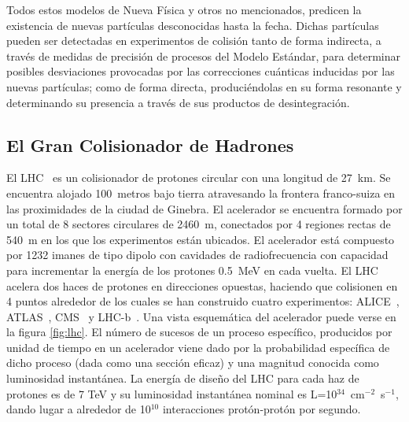 Todos estos modelos de Nueva Física y otros no mencionados, predicen la existencia de nuevas partículas desconocidas hasta la fecha. Dichas partículas pueden ser detectadas en experimentos de colisión tanto de forma indirecta, a través de medidas de precisión de procesos del Modelo Estándar, para determinar posibles desviaciones provocadas por las correcciones cuánticas inducidas por las nuevas partículas; como de forma directa, produciéndolas en su forma resonante y determinando su presencia a través de sus productos de desintegración.   


\subsection{El Gran Colisionador de Hadrones}

El LHC~\cite{LHC} es un colisionador de protones circular con una longitud de 27~km. Se encuentra alojado 100~metros bajo tierra atravesando la frontera franco-suiza en las proximidades de la ciudad de Ginebra. El acelerador se encuentra formado por un total de 8 sectores circulares de 2460~m, conectados por 4 regiones rectas de 540~m en los que los experimentos están ubicados. El acelerador está compuesto por 1232 imanes de tipo dipolo con cavidades de radiofrecuencia con capacidad para incrementar la energía de los protones 0.5~MeV en cada vuelta. El LHC acelera dos haces de protones en direcciones opuestas, haciendo que colisionen en 4 puntos alrededor de los cuales se han construido cuatro experimentos: ALICE~\cite{ALICEDetectorPaper}, ATLAS~\cite{ATLASDetectorPaper}, CMS~\cite{CMSDetectorPaper} y LHC-b~\cite{LHCbDetectorPaper}. Una vista esquemática del acelerador puede verse en la figura \ref{fig:lhc}. El número de sucesos de un proceso específico, producidos por unidad de tiempo en un acelerador viene dado por la probabilidad específica de dicho proceso (dada como una sección eficaz) y una magnitud conocida como luminosidad instantánea. La energía de diseño del LHC para cada haz de protones es de 7 TeV y su luminosidad instantánea nominal es L=10$^{34}$~cm$^{-2}$~s$^{-1}$, dando lugar a alrededor de 10$^{10}$ interacciones protón-protón por segundo.       

